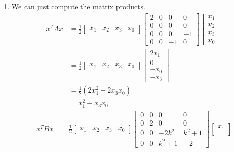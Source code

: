 \documentclass[12 pt, letterpaper]{hmcpset}
\begin{document}
\begin{solution}
\begin{enumerate}
			That is, $a_{4} = \pm k^{2}$. Thus, the points at infinity on $y^{2} = (1 - x^{2})(1 - k^{2} x^{2})$ are $(0 : \pm k : 1 : 0)$.
		\item We can just compute the matrix products.
			\[
				\begin{split}
					x^{T} A x & = \frac{1}{2}
					\begin{bmatrix}
						x_{1} & x_{2} & x_{3} & x_{0}
					\end{bmatrix} \begin{bmatrix}
						2 & 0 & 0 & 0 \\
						0 & 0 & 0 & 0 \\
						0 & 0 & 0 & -1 \\
						0 & 0 & -1 & 0
					\end{bmatrix} \begin{bmatrix}
						x_{1} \\
						x_{2} \\
						x_{3} \\
						x_{0}
					\end{bmatrix} \\
							      & = \frac{1}{2} \begin{bmatrix}
								      x_{1} & x_{2} & x_{3} & x_{0}
							      \end{bmatrix} \begin{bmatrix}
							      	2 x_{1} \\
								0 \\
								- x_{0} \\
								- x_{3}
							      \end{bmatrix} \\
							      & = \frac{1}{2} (2 x_{1}^{2} - 2 x_{3} x_{0}) \\
							      & = x_{1}^{2} - x_{3} x_{0}
				\end{split}
			\]
			\[
				\begin{split}
					x^{T} B x & = \frac{1}{2} \begin{bmatrix}
						x_{1} & x_{2} & x_{3} & x_{0}
					\end{bmatrix}
					\begin{bmatrix}
						0 & 0 & 0 & 0 \\
						0 & 2 & 0 & 0 \\
						0 & 0 & -2k^{2} & k^{2} + 1 \\
						0 & 0 & k^{2} + 1 & -2
					\end{bmatrix}
					\begin{bmatrix}
						x_{1} \\

\end{bmatrix}
\end{split}\]
\end{enumerate}
\end{solution}
\end{document}
